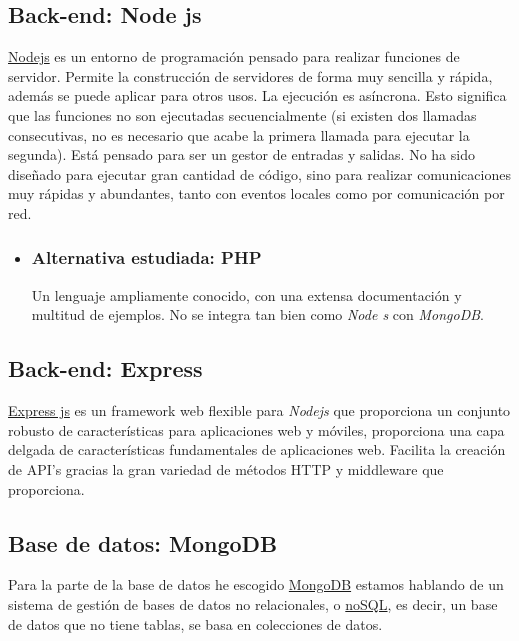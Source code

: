 
\subsection{Back-end: Node js}\label{tecnologias_nodejs}
\href{https://nodejs.org/}{Nodejs} es un entorno de programación pensado para realizar funciones de servidor. Permite la construcción de servidores de forma muy sencilla y rápida, además se puede aplicar para otros usos. La ejecución es asíncrona. Esto significa que las funciones no son ejecutadas secuencialmente (si existen dos llamadas consecutivas, no es necesario que acabe la primera llamada para ejecutar la segunda).
Está pensado para ser un gestor de entradas y salidas. No ha sido diseñado para ejecutar gran cantidad de código, sino para realizar comunicaciones muy rápidas y abundantes, tanto con eventos locales como por comunicación por red.

\begin{itemize}
	\item \subsubsection{Alternativa estudiada: PHP}\label{php}
	Un lenguaje ampliamente conocido, con una extensa documentación y multitud de ejemplos. No se integra tan bien como \emph{Node s} con \emph{MongoDB}. 
\end{itemize}


\subsection{Back-end: Express }\label{tecnologias_expressjs}
\href{http://expressjs.com/}{Express js} es un framework web flexible para \emph{Nodejs} que proporciona un conjunto robusto de características para aplicaciones web y móviles, proporciona una capa delgada de características fundamentales de aplicaciones web. Facilita la creación de API’s gracias la gran variedad de métodos HTTP y middleware que proporciona.


\subsection{Base de datos: MongoDB}\label{tecnologias_mongodb}
Para la parte de la base de datos he escogido \href{https://www.mongodb.com/}{MongoDB} estamos hablando de un sistema de gestión de bases de datos no relacionales, o \href{https://es.wikipedia.org/wiki/NoSQL}{noSQL}, es decir, un base de datos que no tiene tablas, se basa en colecciones de datos.

